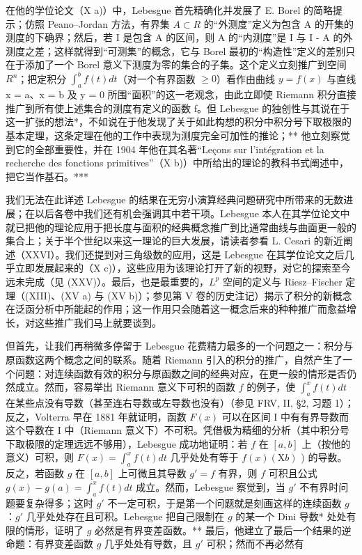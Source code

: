 在他的学位论文（X a)）中，Lebesgue 首先精确化并发展了 E. Borel 的简略提示；仿照 Peano--Jordan 方法，有界集 \(A \subset R\) 的“外测度”定义为包含 A 的开集的测度的下确界；然后，若 I 是包含 A 的区间，则 A 的“内测度”是 I 与 I - A 的外测度之差；这样就得到“可测集”的概念，它与 Borel 最初的“构造性”定义的差别只在于添加了一个 Borel 意义下测度为零的集合的子集。这个定义立刻推广到空间 \(R^{n}\)；把定积分 \(\int_{a}^{b} f(t) dt\)（对一个有界函数 \(\geqslant 0\)）看作由曲线 \(y = f(x)\) 与直线 x = a、x = b 及 y = 0 所围“面积”的这一老观念，由此立即使 Riemann 积分直接推广到所有使上述集合的测度有定义的函数 f。但 Lebesgue 的独创性与其说在于这一扩张的想法*，不如说在于他发现了关于如此构想的积分中积分号下取极限的基本定理，这条定理在他的工作中表现为测度完全可加性的推论；** 他立刻察觉到它的全部重要性，并在 1904 年他在其名著“Leçons sur l'intégration et la recherche des fonctions primitives”（X b)）中所给出的理论的教科书式阐述中，把它当作基石。***

我们无法在此详述 Lebesgue 的结果在无穷小演算经典问题研究中所带来的无数进展；在以后各卷中我们还有机会强调其中若干项。Lebesgue 本人在其学位论文中就已把他的理论应用于把长度与面积的经典概念推广到比通常曲线与曲面更一般的集合上；关于半个世纪以来这一理论的巨大发展，请读者参看 L. Cesari 的新近阐述（XXVI）。我们还提到对三角级数的应用，这是 Lebesgue 在其学位论文之后几乎立即发展起来的（X c)），这些应用为该理论打开了新的视野，对它的探索至今远未完成（见 (XXV)）。最后，也是最重要的，\(L^{p}\) 空间的定义与 Riesz--Fischer 定理（(XIII)、(XV a) 与 (XV b)）；参见第 V 卷的历史注记）揭示了积分的新概念在泛函分析中所能起的作用；这一作用只会随着这一概念后来的种种推广而愈益增长，对这些推广我们马上就要谈到。

但首先，让我们再稍微多停留于 Lebesgue 花费精力最多的一个问题之一：积分与原函数这两个概念之间的联系。随着 Riemann 引入的积分的推广，自然产生了一个问题：对连续函数有效的积分与原函数之间的经典对应，在更一般的情形是否仍然成立。然而，容易举出 Riemann 意义下可积的函数 \(f\) 的例子，使 \(\int_{a}^{x} f(t) dt\) 在某些点没有导数（甚至连右导数或左导数也没有）（参见 FRV, II, §2, 习题 1）；反之，Volterra 早在 1881 年就证明，函数 \(F(x)\) 可以在区间 I 中有有界导数而这个导数在 I 中（Riemann 意义下）不可积。凭借极为精细的分析（其中积分号下取极限的定理远远不够用），Lebesgue 成功地证明：若 \(f\) 在 \([a, b]\) 上（按他的意义）可积，则 \(F(x) = \int_{a}^{x} f(t) dt\) 几乎处处有等于 \(f(x) (\mathrm{X}b)\) ) 的导数。反之，若函数 \(g\) 在 \([a, b]\) 上可微且其导数 \(g' = f\) 有界，则 \(f\) 可积且公式 \(g(x) - g(a) = \int_{a}^{x} f(t) dt\) 成立。然而，Lebesgue 察觉到，当 \(g'\) 不有界时问题要复杂得多；这时 \(g'\) 不一定可积，于是第一个问题就是刻画这样的连续函数 \(g\)：\(g'\) 几乎处处存在且可积。Lebesgue 把自己限制在 \(g\) 的某一个 Dini 导数* 处处有限的情形，证明了 \(g\) 必然是有界变差函数。** 最后，他建立了最后一个结果的逆命题：有界变差函数 \(g\) 几乎处处有导数，且 \(g'\) 可积；然而不再必然有

